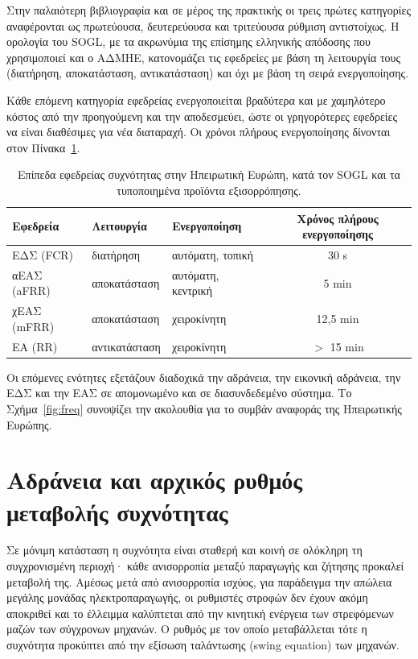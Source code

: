 Στην παλαιότερη βιβλιογραφία και σε μέρος της πρακτικής οι τρεις πρώτες κατηγορίες
αναφέρονται ως πρωτεύουσα, δευτερεύουσα και τριτεύουσα ρύθμιση αντιστοίχως. Η ορολογία του
SOGL, με τα ακρωνύμια της επίσημης ελληνικής απόδοσης που χρησιμοποιεί και ο ΑΔΜΗΕ,
κατονομάζει τις εφεδρείες με βάση τη λειτουργία τους (διατήρηση, αποκατάσταση,
αντικατάσταση) και όχι με βάση τη σειρά ενεργοποίησης.

Κάθε επόμενη κατηγορία εφεδρείας ενεργοποιείται βραδύτερα και με χαμηλότερο κόστος από την
προηγούμενη και την αποδεσμεύει, ώστε οι γρηγορότερες εφεδρείες να είναι διαθέσιμες για νέα
διαταραχή. Οι χρόνοι πλήρους ενεργοποίησης δίνονται στον Πίνακα~\ref{tab:reserves}.

\begin{table}[!htbp]
\centering
\begin{tabular}{lllc}
\hline
Εφεδρεία & Λειτουργία & Ενεργοποίηση & Χρόνος πλήρους ενεργοποίησης \\
\hline
ΕΔΣ (FCR)   & διατήρηση      & αυτόματη, τοπική   & 30 s \\
αΕΑΣ (aFRR) & αποκατάσταση   & αυτόματη, κεντρική & 5 min \\
χΕΑΣ (mFRR) & αποκατάσταση   & χειροκίνητη        & 12,5 min \\
ΕΑ (RR)     & αντικατάσταση  & χειροκίνητη        & $>$ 15 min \\
\hline
\end{tabular}
\caption{Επίπεδα εφεδρείας συχνότητας στην Ηπειρωτική Ευρώπη, κατά τον SOGL και τα
τυποποιημένα προϊόντα εξισορρόπησης.}
\label{tab:reserves}
\end{table}

Οι επόμενες ενότητες εξετάζουν διαδοχικά την αδράνεια, την εικονική αδράνεια, την ΕΔΣ και
την ΕΑΣ σε απομονωμένο και σε διασυνδεδεμένο σύστημα. Το Σχήμα~\ref{fig:freq} συνοψίζει
την ακολουθία για το συμβάν αναφοράς της Ηπειρωτικής Ευρώπης.

\section{Αδράνεια και αρχικός ρυθμός μεταβολής συχνότητας}
\label{sec:inertia}

Σε μόνιμη κατάσταση η συχνότητα είναι σταθερή και κοινή σε ολόκληρη τη συγχρονισμένη
περιοχή· κάθε ανισορροπία μεταξύ παραγωγής και ζήτησης προκαλεί μεταβολή της. Αμέσως μετά από
ανισορροπία ισχύος, για παράδειγμα την απώλεια μεγάλης μονάδας ηλεκτροπαραγωγής, οι ρυθμιστές
στροφών δεν έχουν ακόμη αποκριθεί και το έλλειμμα καλύπτεται από την κινητική ενέργεια των
στρεφόμενων μαζών των σύγχρονων μηχανών. Ο ρυθμός με τον οποίο μεταβάλλεται τότε η συχνότητα
προκύπτει από την εξίσωση ταλάντωσης (swing equation) των μηχανών.

